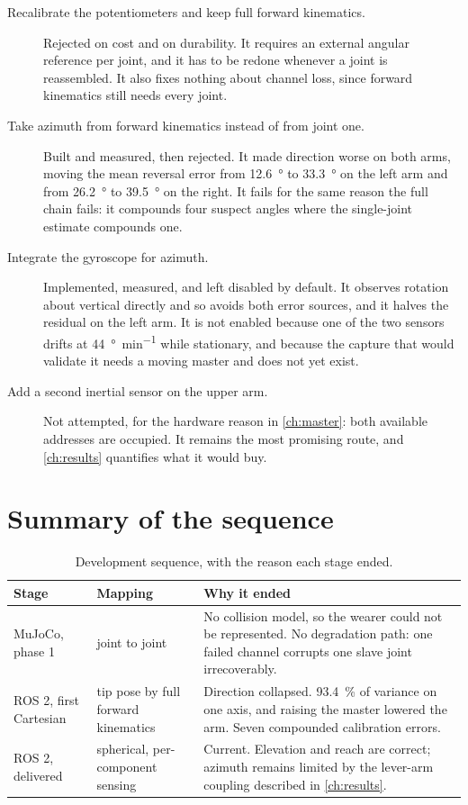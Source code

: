 \begin{description}
  \item[Recalibrate the potentiometers and keep full forward kinematics.]
    Rejected on cost and on durability. It requires an external angular
    reference per joint, and it has to be redone whenever a joint is
    reassembled. It also fixes nothing about channel loss, since forward
    kinematics still needs every joint.
  \item[Take azimuth from forward kinematics instead of from joint one.] Built
    and measured, then rejected. It made direction worse on both arms, moving
    the mean reversal error from \SI{12.6}{\degree} to \SI{33.3}{\degree} on
    the left arm and from \SI{26.2}{\degree} to \SI{39.5}{\degree} on the
    right. It fails for the same reason the full chain fails: it compounds
    four suspect angles where the single-joint estimate compounds one.
  \item[Integrate the gyroscope for azimuth.] Implemented, measured, and left
    disabled by default. It observes rotation about vertical directly and so
    avoids both error sources, and it halves the residual on the left arm. It
    is not enabled because one of the two sensors drifts at
    \SI{44}{\degree\per\minute} while stationary, and because the capture that
    would validate it needs a moving master and does not yet exist.
  \item[Add a second inertial sensor on the upper arm.] Not attempted, for the
    hardware reason in \cref{ch:master}: both available addresses are
    occupied. It remains the most promising route, and
    \cref{ch:results} quantifies what it would buy.
\end{description}

\section{Summary of the sequence}

\begin{table}[htbp]
  \centering
  \caption{Development sequence, with the reason each stage ended.}
  \label{tab:devpath}
  \begin{tabular}{@{}p{31mm}p{34mm}p{62mm}@{}}
    \toprule
    Stage & Mapping & Why it ended \\
    \midrule
    MuJoCo, phase 1 & joint to joint &
      No collision model, so the wearer could not be represented. No
      degradation path: one failed channel corrupts one slave joint
      irrecoverably. \\
    ROS 2, first Cartesian & tip pose by full forward kinematics &
      Direction collapsed. \SI{93.4}{\percent} of variance on one axis, and
      raising the master lowered the arm. Seven compounded calibration errors. \\
    ROS 2, delivered & spherical, per-component sensing &
      Current. Elevation and reach are correct; azimuth remains limited by the
      lever-arm coupling described in \cref{ch:results}. \\
    \bottomrule
  \end{tabular}
\end{table}


